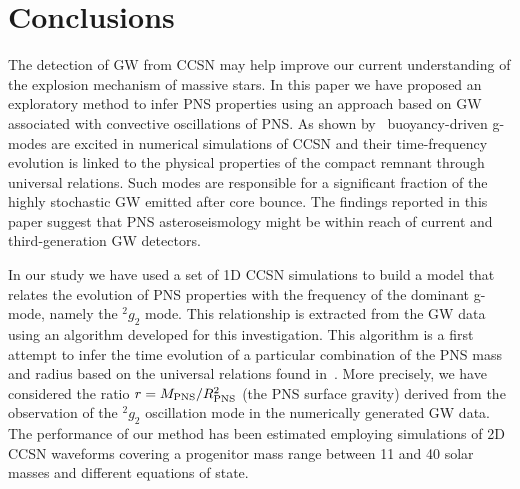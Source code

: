 \section{Conclusions}
\label{sec:conclusion}

The detection of GW from CCSN may help improve our current understanding of the explosion mechanism of massive stars.  
In this paper we have proposed an exploratory method to infer PNS properties using an approach based on GW associated with convective oscillations of PNS. As shown by~\citep{Torres:2019b} buoyancy-driven g-modes are excited in numerical simulations of CCSN and their time-frequency evolution is linked to the physical properties of the compact remnant through universal relations. Such modes are responsible for a significant fraction of the highly stochastic GW emitted after core bounce. The findings reported in this paper suggest that PNS asteroseismology might be within reach of current and third-generation GW detectors.

In our study we have used a set of 1D CCSN simulations to build a model that relates the  evolution of PNS properties with the frequency of the dominant g-mode, namely the $\mbox{}^2g_2$ mode. This relationship is extracted from the GW data using an algorithm developed for this investigation. This algorithm is  a first attempt to infer the time evolution of a particular combination of the PNS mass and radius based on the universal relations found in~\citep{Torres:2019b}. More precisely, we have considered the ratio $r=M_{\rm PNS}/R_{\rm PNS}^2$ (the PNS surface gravity) derived from the observation of the $\mbox{}^2g_2$ oscillation mode in the numerically generated GW data. The  performance of our method has been estimated employing  simulations of 2D CCSN waveforms covering a progenitor mass range between 11 and 40 solar masses and different equations of state. 

